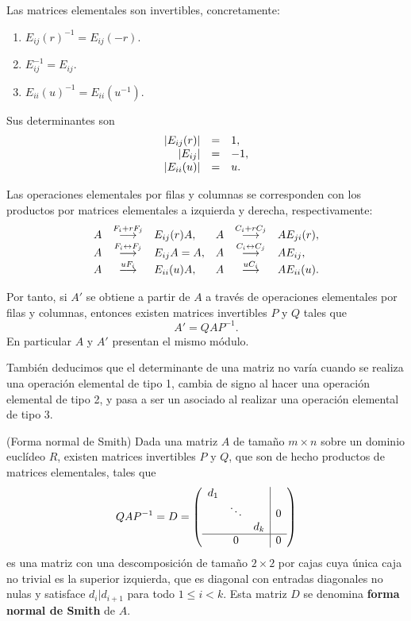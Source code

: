 

Las matrices elementales son invertibles, concretamente:

\begin{enumerate}
\def\labelenumi{\arabic{enumi}.}
\item
  \(E_{ij}( r )^{-1}=E_{ij}(-r)\).
\item
  \(E_{ij}^{-1}=E_{ij}\).
\item
  \(E_{ii}(u)^{-1}=E_{ii}(u^{-1})\).
\end{enumerate}

Sus determinantes son \[\begin{array}{rcl}
|E_{ij}( r )|&=&1,\cr
|E_{ij}|&=&-1,\cr
|E_{ii}(u)|&=&u.
\end{array}\]

Las operaciones elementales por filas y columnas se corresponden con los
productos por matrices elementales a izquierda y derecha,
respectivamente: \[\begin{array}{rclrcl}
A&\stackrel{F_i+rF_j}\longrightarrow& E_{ij}( r )A,& A&\stackrel{C_i+rC_j}\longrightarrow& AE_{ji}( r ),\cr
A&\stackrel{F_i\leftrightarrow F_j}\longrightarrow &E_{ij}A=A,&  A&\stackrel{C_i\leftrightarrow C_j}\longrightarrow& AE_{ij},\cr
A&\stackrel{uF_i}\longrightarrow& E_{ii}(u)A,& A&\stackrel{uC_i}\longrightarrow& AE_{ii}(u).
\end{array}\]

Por tanto, si \(A'\) se obtiene a partir de \(A\) a través de
operaciones elementales por filas y columnas, entonces existen matrices
invertibles \(P\) y \(Q\) tales que \[A'=QAP^{-1}.\] En particular \(A\)
y \(A'\) presentan el mismo módulo.

También deducimos que el determinante de una matriz no varía cuando se
realiza una operación elemental de tipo 1, cambia de signo al hacer una
operación elemental de tipo 2, y pasa a ser un asociado al realizar una
operación elemental de tipo 3. 

\textrm{\normalfont (Forma normal de Smith)}\label{smith}
Dada una matriz \(A\) de tamaño \(m\times n\) sobre un dominio euclídeo
\(R\), existen matrices invertibles \(P\) y \(Q\), que son de hecho
productos de matrices elementales, tales que
\[QAP^{-1}=D=\left( \begin{array}{ccc|c} d_1&&&\cr &\ddots&&0\cr &&d_k&\cr \hline &0&&0 \end{array} \right)\]
es una matriz con una descomposición de tamaño \(2\times 2\) por cajas
cuya única caja no trivial es la superior izquierda, que es diagonal con
entradas diagonales no nulas y satisface \(d_i|d_{i+1}\) para todo
\(1\leq i {<} k\). Esta matriz \(D\) se denomina \textbf{forma normal de
Smith} de \(A\). 

